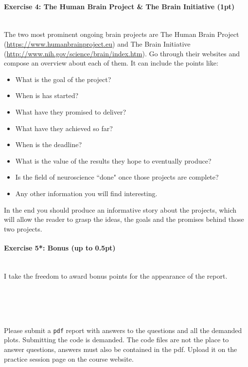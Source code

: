 \documentclass[a4paper,11pt]{article}
\newenvironment{exercise}[3]{\paragraph{Exercise #1: #2 (#3pt)}\ \\}{
\medskip}
\begin{document}
\begin{exercise}{4}{The Human Brain Project \& The Brain Initiative}{1}
The two most prominent ongoing brain projects are The Human Brain Project (\url{https://www.humanbrainproject.eu}) and The Brain Initiative (\url{http://www.nih.gov/science/brain/index.htm}). Go through their websites and compose an overview about each of them. It can include the points like:
\begin{itemize}
\itemsep 0em
	\item What is the goal of the project?
	\item When is has started?
	\item What have they promised to deliver?
	\item What have they achieved so far?
	\item When is the deadline?
	\item What is the value of the results they hope to eventually produce?
	\item Is the field of neuroscience ``done" once those projects are complete?
	\item Any other information you will find interesting.
\end{itemize}
In the end you should produce an informative story about the projects, which will allow the reader to grasp the ideas, the goals and the promises behind those two projects.
\end{exercise}

\begin{exercise}{5*}{Bonus}{up to 0.5}
I take the freedom to award bonus points for the appearance of the report.
\end{exercise}


\ \\
\ \\
\ \\
\ \\

Please submit a \texttt{pdf} report with answers to the questions and all the demanded plots. Submitting the code is demanded. The code files are not the place to answer questions, answers must also be contained in the pdf. Upload it on the practice session page on the course website.
\end{document}
